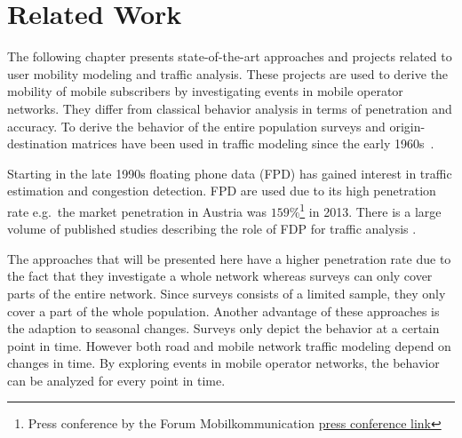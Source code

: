 \chapter{Related Work}
The following chapter presents state-of-the-art approaches and projects related to user mobility modeling and traffic analysis. These projects are used to derive the mobility of mobile subscribers by investigating events in mobile operator networks. They differ from classical behavior analysis in terms of penetration and accuracy. To derive the behavior of the entire population surveys and origin-destination matrices have been used in traffic modeling since the early 1960s~\cite{Beckmann,Heanue1966,Voorhees}.

Starting in the late 1990s floating phone data (FPD) has gained interest in traffic estimation and congestion detection. FPD are used due to its high penetration rate e.g.\, the market penetration in Austria was $159\%$\footnote{Press conference by the Forum Mobilkommunication \href{http://www.fmk.at/Medien/Pressekonferenzen/FMK-Jahrespressekonferenz-2012}{press conference link}} in 2013. There is a large volume of published studies describing the role of FDP for traffic analysis \cite{Yim2001,Qiu2007,Caceres2008}.

The approaches that will be presented here have a higher penetration rate due to the fact that they investigate a whole network whereas surveys can only cover parts of the entire network. Since surveys consists of a limited sample, they only cover a part of the whole population. Another advantage of these approaches is the adaption to seasonal changes. Surveys only depict the behavior at a certain point in time. However both road and mobile network traffic modeling depend on changes in time. By exploring events in mobile operator networks, the behavior can be analyzed for every point in time.

